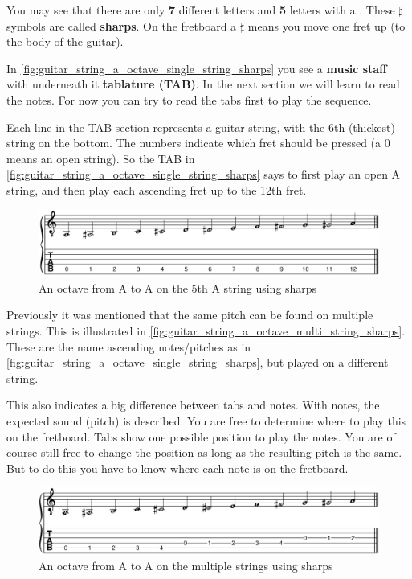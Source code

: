 You may see that there are only \textbf{7} different letters and \textbf{5} letters with a \textbf{\sharp}. These $\sharp$ symbols are called \textbf{sharps}. On the fretboard a $\sharp$ means you move one fret up (to the body of the guitar).

In \autoref{fig:guitar_string_a_octave_single_string_sharps} you see a \textbf{music staff} with underneath it \textbf{tablature (TAB)}. In the next section we will learn to read the notes. For now you can try to read the tabs first to play the sequence.

Each line in the TAB section represents a guitar string, with the 6th (thickest) string on the bottom. The numbers indicate which fret should be pressed (a 0 means an open string). So the TAB in \autoref{fig:guitar_string_a_octave_single_string_sharps} says to first play an open A string, and then play each ascending fret up to the 12th fret.

\begin{figure}[h]
    \centering
    \includegraphics[width=\textwidth]{../../MuseScore/Guitar/PitchesSharpsSingleString.png}
    \caption{An octave from A to A on the 5th A string using sharps}
    \label{fig:guitar_string_a_octave_single_string_sharps}
\end{figure}

\newpage

Previously it was mentioned that the same pitch can be found on multiple strings. This is illustrated in \autoref{fig:guitar_string_a_octave_multi_string_sharps}. These are the name ascending notes/pitches as in \autoref{fig:guitar_string_a_octave_single_string_sharps}, but played on a different string.

This also indicates a big difference between tabs and notes. With notes, the expected sound (pitch) is described. You are free to determine where to play this on the fretboard. Tabs show one possible position to play the notes. You are of course still free to change the position as long as the resulting pitch is the same. But to do this you have to know where each note is on the fretboard.

\begin{figure}[h]
	\centering
	\includegraphics[width=\textwidth]{../../MuseScore/Guitar/PitchesSharpsMultiString.png}
	\caption{An octave from A to A on the multiple strings using sharps}
	\label{fig:guitar_string_a_octave_multi_string_sharps}
\end{figure}

